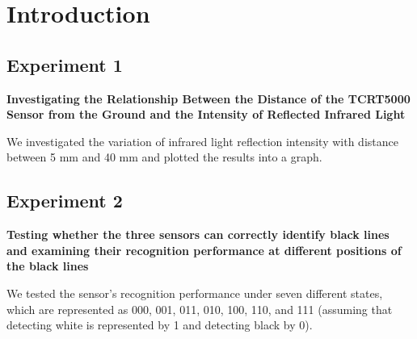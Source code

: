 \section{Introduction}\label{sec:introduction}

\subsection{Experiment 1}\label{subsec:experiment-12}
\textbf{Investigating the Relationship Between the Distance of the TCRT5000 Sensor from the Ground and the Intensity of Reflected Infrared Light}

We investigated the variation of infrared light reflection intensity with distance between 5 mm and 40 mm and plotted the results into a graph.

\subsection{Experiment 2}\label{subsec:experiment-22}
\textbf{Testing whether the three sensors can correctly identify black lines and examining their recognition performance at different positions of the black lines}

We tested the sensor's recognition performance under seven different states, which are represented as 000, 001, 011, 010, 100, 110, and 111 (assuming that detecting white is represented by 1 and detecting black by 0).

